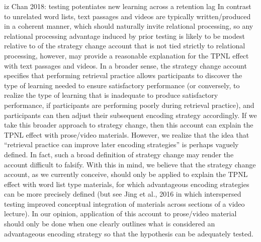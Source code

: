 \documentclass[../main.tex]{subfiles}
\begin{document}
iz Chan 2018: testing potentiates new learning across a retention lag
In contrast to unrelated word lists, text passages and videos are
typically written/produced in a coherent manner, which should naturally
invite relational processing, so any relational processing advantage
induced by prior testing is likely to be modest relative to
of the strategy change account that is not tied strictly to relational
processing, however, may provide a reasonable explanation for the
TPNL effect with text passages and videos. In a broader sense, the
strategy change account specifies that performing retrieval practice
allows participants to discover the type of learning needed to ensure
satisfactory performance (or conversely, to realize the type of learning
that is inadequate to produce satisfactory performance, if participants
are performing poorly during retrieval practice), and participants can
then adjust their subsequent encoding strategy accordingly. If we take
this broader approach to strategy change, then this account can explain
the TPNL effect with prose/video materials. However, we realize that
the idea that “retrieval practice can improve later encoding strategies”
is perhaps vaguely defined. In fact, such a broad definition of strategy
change may render the account difficult to falsify. With this in mind, we
believe that the strategy change account, as we currently conceive,
should only be applied to explain the TPNL effect with word list type
materials, for which advantageous encoding strategies can be more
precisely defined (but see Jing et al., 2016 in which interspersed testing
improved conceptual integration of materials across sections of a video
lecture). In our opinion, application of this account to prose/video
material should only be done when one clearly outlines what is considered
an advantageous encoding strategy so that the hypothesis can
be adequately tested.
\end{document}
